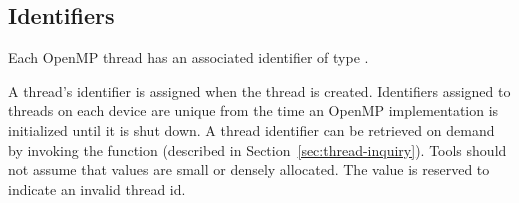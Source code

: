 \begin{comment}
\section{OMPT Inquiry Functions}
\label{sec:omptFunctions}


 Inquiry functions retrieve data from the execution environment for
 the tools. 
 All functions in the inquiry API are marked with \code{OMPT\_API}. These functions should not be global symbols in an OpenMP implementation to avoid tempting tool developers to call them directly. Section~\ref{sec:init} describes how a tool should obtain pointers to these inquiry functions.
 {\em All inquiry functions are async signal safe.} 
 Note that it is unsafe to call OpenMP Execution Environment Routines within an OMPT callback because doing so may cause deadlock. 
 Specifically, since OpenMP Execution Library Routines are not guaranteed to be async signal safe, they might acquire a lock that may already be held when an OMPT callback is involved.
\end{comment}
\subsection{Identifiers}
\label{sec:runtimeStates}


Each OpenMP thread  has an associated identifier of type .
\begin{comment}
\begin{boxedcode}
typedef uint64\_t ompt\_thread\_id\_t;
\end{boxedcode}
\end{comment}
  A thread's identifier is assigned when the thread is created.
  Identifiers assigned to threads on each device are unique from the time an OpenMP implementation is initialized until it is shut down.
  A thread identifier can be retrieved
  on demand by invoking the  
  function (described in Section~\ref{sec:thread-inquiry}).
  Tools should not assume that  values are small or densely allocated.
  The value  is reserved to indicate an invalid thread id.

